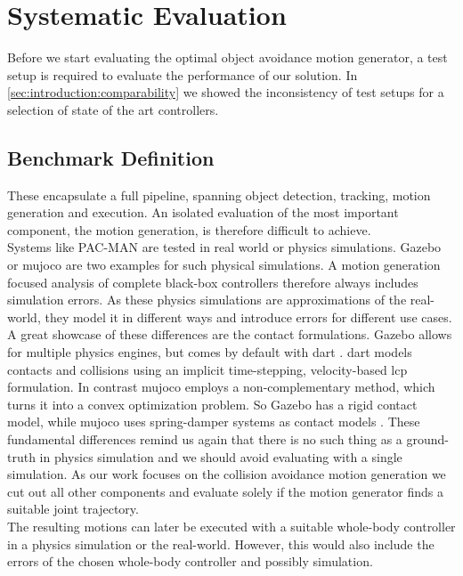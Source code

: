 \section{Systematic Evaluation} \label{sec:eval}

Before we start evaluating the optimal object avoidance motion generator, a test setup is required to evaluate the performance of our solution.
In \cref{sec:introduction:comparability} we showed the inconsistency of test setups for a selection of state of the art controllers.

\subsection{Benchmark Definition} \label{sec:eval:setup}
These encapsulate a full pipeline, spanning object detection, tracking, motion generation and execution.
An isolated evaluation of the most important component, the motion generation, is therefore difficult to achieve.
\\
Systems like {PAC-MAN} \cite{yang_2026} are tested in real world or physics simulations.
Gazebo \cite{koenig_2004} or \acrfull{mujoco} \cite{todorov_2012} are two examples for such physical simulations.
A motion generation focused analysis of complete black-box controllers therefore always includes simulation errors.
As these physics simulations are approximations of the real-world, they model it in different ways and introduce errors for different use cases.
A great showcase of these differences are the contact formulations.
Gazebo allows for multiple physics engines, but comes by default with \acrfull{dart} \cite{lee_2018}.
\acrshort{dart} models contacts and collisions using an implicit time-stepping, velocity-based \acrfull{lcp} formulation.
In contrast \acrshort{mujoco} employs a non-complementary method, which turns it into a convex optimization problem.
So Gazebo has a rigid contact model, while \acrshort{mujoco} uses spring-damper systems as contact models \cite{lee_2018} \cite{todorov_2012}.
These fundamental differences remind us again that there is no such thing as a ground-truth in physics simulation and we should avoid evaluating with a single simulation.
As our work focuses on the collision avoidance motion generation we cut out all other components and evaluate solely if the motion generator finds a suitable joint trajectory.
\\
The resulting motions can later be executed with a suitable whole-body controller in a physics simulation or the real-world.
However, this would also include the errors of the chosen whole-body controller and possibly simulation.
